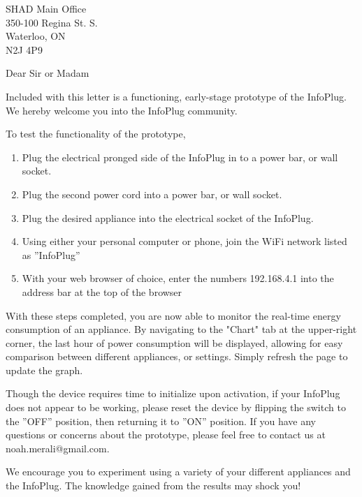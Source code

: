 \documentclass[]{letter}
\begin{document}
	\signature{InfoPlug Ltd.}
	\address{Memorial University of Newfoundland \\ St. Johns,  NL\\A1B 3X9}
	\begin{letter}{SHAD Main Office \\ 350-100 Regina St. S. \\ Waterloo, ON \\ N2J 4P9}
		\opening{Dear Sir or Madam}
		
		Included with this letter is a functioning, early-stage prototype of the InfoPlug. We hereby welcome you into the InfoPlug community.
		
		To test the functionality of the prototype,

		 \begin{enumerate}

		 	\item Plug the electrical pronged side of the InfoPlug in to a power bar, or wall socket.
		 	\item Plug the second power cord into a power bar, or wall socket.
		 	\item Plug the desired appliance into the electrical socket of the InfoPlug.
		 	\item Using either your personal computer or phone, join the WiFi network listed as ”InfoPlug”
		 	\item With your web browser of choice, enter the numbers 192.168.4.1 into the address bar at the top of the browser
		 \end{enumerate}
		
		With these steps completed, you are now able to monitor the real-time energy consumption of an appliance. By navigating to the "Chart" tab at the upper-right corner, the last hour of power consumption will be displayed, allowing for easy comparison between different appliances, or settings. Simply refresh the page to update the graph. 
		
		
		Though the device requires time to initialize upon activation, if your InfoPlug does not appear to be working, please reset the device by flipping the switch to the ”OFF” position, then returning it to ”ON” position. If you have any questions or concerns about the prototype, please feel free to contact us at noah.merali@gmail.com. 
		
		We encourage you to experiment using a variety of your different appliances and the InfoPlug. The knowledge gained from the results may shock you!
		

\end{letter}
\end{document}
